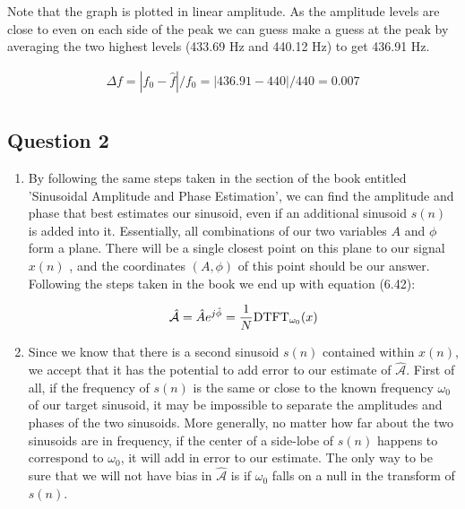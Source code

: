 \documentclass[11pt]{article}
\begin{document}
\begin{enumerate}
Note that the graph is plotted in linear amplitude. As the amplitude levels are close to even on each side of the peak we can guess make a guess at the peak by averaging the two highest levels (433.69 Hz and 440.12 Hz) to get 436.91 Hz.

\begin{eqnarray*}
\Delta f = |f_0 - \hat f | / f_0 =  |436.91 - 440| / 440 =  0.007 \\
\end{eqnarray*}

\end{enumerate}


\subsection*{Question 2}
\begin{enumerate}
\item By following the same steps taken in the section of the book entitled 'Sinusoidal Amplitude and Phase Estimation', we can find the amplitude and phase that best estimates our sinusoid, even if an additional sinusoid $s(n)$ is added into it. Essentially, all combinations of our two variables $A$ and $\phi$ form a plane. There will be a single closest point on this plane to our signal $x(n)$	, and the coordinates $(A, \phi)$ of this point should be our answer. Following the steps taken in the book we end up with equation (6.42):

\begin{eqnarray*}
\mathcal{\hat A} = \hat A e ^ {j \hat \phi } = \frac{1}{N} \hbox{DTFT}_{\omega_{0}} (x) \\
\end{eqnarray*}

\item Since we know that there is a second sinusoid $s(n)$ contained within $x(n)$, we accept that it has the potential to add error to our estimate of $\mathcal{\hat A}$. First of all, if the frequency of $s(n)$ is the same or close to the known frequency $\omega_{0}$ of our target sinusoid, it may be impossible to separate the amplitudes and phases of the two sinusoids. More generally, no matter how far about the two sinusoids are in frequency, if the center of a side-lobe of $s(n)$ happens to correspond to $\omega_{0}$, it will add in error to our estimate. The only way to be sure that we will not have bias in $\mathcal{\hat A}$ is if $\omega_{0}$ falls on a null in the transform of $s(n)$.
\end{enumerate}
\end{document}
